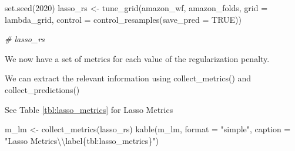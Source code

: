 \documentclass[
]{article}
\newenvironment{Shaded}{}{}
\newcommand{\AttributeTok}[1]{\textcolor[rgb]{0.49,0.56,0.16}{#1}}
\newcommand{\CommentTok}[1]{\textcolor[rgb]{0.38,0.63,0.69}{\textit{#1}}}
\newcommand{\ConstantTok}[1]{\textcolor[rgb]{0.53,0.00,0.00}{#1}}
\newcommand{\DecValTok}[1]{\textcolor[rgb]{0.25,0.63,0.44}{#1}}
\newcommand{\FunctionTok}[1]{\textcolor[rgb]{0.02,0.16,0.49}{#1}}
\newcommand{\NormalTok}[1]{#1}
\newcommand{\OtherTok}[1]{\textcolor[rgb]{0.00,0.44,0.13}{#1}}
\newcommand{\SpecialCharTok}[1]{\textcolor[rgb]{0.25,0.44,0.63}{#1}}
\newcommand{\StringTok}[1]{\textcolor[rgb]{0.25,0.44,0.63}{#1}}
\begin{document}
\begin{Shaded}
\begin{Highlighting}[]
\FunctionTok{set.seed}\NormalTok{(}\DecValTok{2020}\NormalTok{)}
\NormalTok{lasso\_rs }\OtherTok{\textless{}{-}} \FunctionTok{tune\_grid}\NormalTok{(amazon\_wf, amazon\_folds, }\AttributeTok{grid =}\NormalTok{ lambda\_grid, }\AttributeTok{control =} \FunctionTok{control\_resamples}\NormalTok{(}\AttributeTok{save\_pred =} \ConstantTok{TRUE}\NormalTok{))}

\CommentTok{\# lasso\_rs}
\end{Highlighting}
\end{Shaded}

We now have a set of metrics for each value of the regularization
penalty.

We can extract the relevant information using collect\_metrics() and
collect\_predictions()

See Table \ref{tbl:lasso_metrics} for Lasso Metrics

\begin{Shaded}
\begin{Highlighting}[]
\NormalTok{m\_lm }\OtherTok{\textless{}{-}} \FunctionTok{collect\_metrics}\NormalTok{(lasso\_rs)}
\FunctionTok{kable}\NormalTok{(m\_lm, }\AttributeTok{format =} \StringTok{"simple"}\NormalTok{, }\AttributeTok{caption =} \StringTok{"Lasso Metrics}\SpecialCharTok{\textbackslash{}\textbackslash{}}\StringTok{label\{tbl:lasso\_metrics\}"}\NormalTok{)}
\end{Highlighting}
\end{Shaded}
\end{document}
